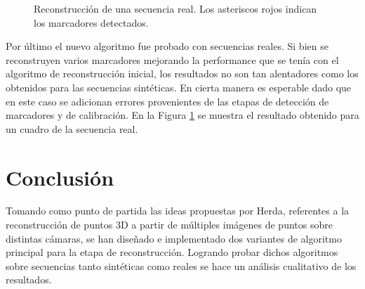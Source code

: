 \begin{figure}[ht!]
   \caption{Reconstrucción de una secuencia real. Los asteriscos rojos indican los marcadores detectados.} 
   \label{img_reconstruccion_real2}    
\end{figure} 

Por último el nuevo algoritmo fue probado con secuencias reales. Si bien se reconstruyen varios marcadores mejorando la performance que se tenía con el algoritmo de reconstrucción inicial, los resultados no son tan alentadores como los obtenidos para las secuencias sintéticas. En cierta manera es esperable dado que en este caso se adicionan errores provenientes de las etapas de detección de marcadores y de calibración. En la Figura \ref{img_reconstruccion_real2} se muestra el resultado obtenido para un cuadro de la secuencia real. 




\section{Conclusión} 

Tomando como punto de partida las ideas propuestas por Herda, referentes a la reconstrucción de puntos 3D a partir de múltiples imágenes de puntos sobre distintas cámaras,  se han diseñado e implementado dos variantes de algoritmo principal para la etapa de reconstrucción. Logrando probar dichos algoritmos sobre secuencias tanto sintéticas como reales se hace un análisis cualitativo de los resultados.\\



